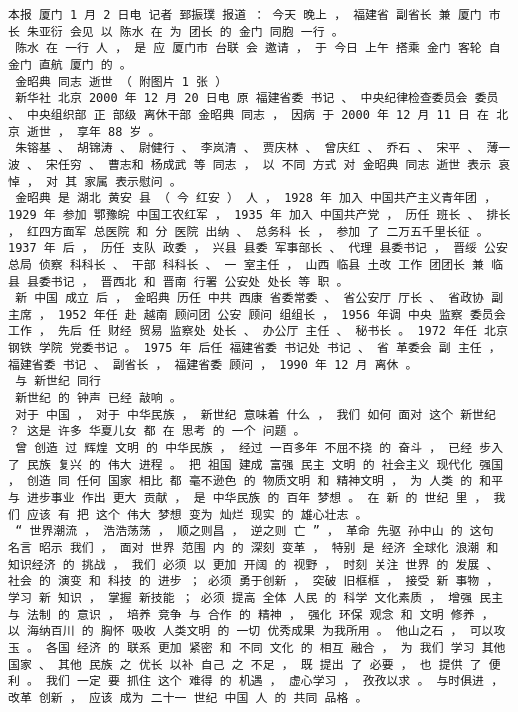 \documentclass{article}
\begin{document}
\begin{Verbatim}[commandchars=\\\{\}]
 本报 厦门 1 月 2 日电 记者 郅振璞 报道 ： 今天 晚上 ， 福建省 副省长 兼 厦门 市长 朱亚衍 会见 以 陈水 在 为 团长 的 金门 同胞 一行 。 
 陈水 在 一行 人 ， 是 应 厦门市 台联 会 邀请 ， 于 今日 上午 搭乘 金门 客轮 自 金门 直航 厦门 的 。 
 金昭典 同志 逝世 （ 附图片 1 张 ） 
 新华社 北京 2000 年 12 月 20 日电 原 福建省委 书记 、 中央纪律检查委员会 委员 、 中央组织部 正 部级 离休干部 金昭典 同志 ， 因病 于 2000 年 12 月 11 日 在 北京 逝世 ， 享年 88 岁 。 
 朱镕基 、 胡锦涛 、 尉健行 、 李岚清 、 贾庆林 、 曾庆红 、 乔石 、 宋平 、 薄一波 、 宋任穷 、 曹志和 杨成武 等 同志 ， 以 不同 方式 对 金昭典 同志 逝世 表示 哀悼 ， 对 其 家属 表示慰问 。 
 金昭典 是 湖北 黄安 县 （ 今 红安 ） 人 ， 1928 年 加入 中国共产主义青年团 ， 1929 年 参加 鄂豫皖 中国工农红军 ， 1935 年 加入 中国共产党 ， 历任 班长 、 排长 ， 红四方面军 总医院 和 分 医院 出纳 、 总务科 长 ， 参加 了 二万五千里长征 。 1937 年 后 ， 历任 支队 政委 ， 兴县 县委 军事部长 、 代理 县委书记 ， 晋绥 公安 总局 侦察 科科长 、 干部 科科长 、 一 室主任 ， 山西 临县 土改 工作 团团长 兼 临县 县委书记 ， 晋西北 和 晋南 行署 公安处 处长 等 职 。 
 新 中国 成立 后 ， 金昭典 历任 中共 西康 省委常委 、 省公安厅 厅长 、 省政协 副 主席 ， 1952 年任 赴 越南 顾问团 公安 顾问 组组长 ， 1956 年调 中央 监察 委员会 工作 ， 先后 任 财经 贸易 监察处 处长 、 办公厅 主任 、 秘书长 。 1972 年任 北京 钢铁 学院 党委书记 。 1975 年 后任 福建省委 书记处 书记 、 省 革委会 副 主任 ， 福建省委 书记 、 副省长 ， 福建省委 顾问 ， 1990 年 12 月 离休 。 
 与 新世纪 同行 
 新世纪 的 钟声 已经 敲响 。 
 对于 中国 ， 对于 中华民族 ， 新世纪 意味着 什么 ， 我们 如何 面对 这个 新世纪 ？ 这是 许多 华夏儿女 都 在 思考 的 一个 问题 。 
 曾 创造 过 辉煌 文明 的 中华民族 ， 经过 一百多年 不屈不挠 的 奋斗 ， 已经 步入 了 民族 复兴 的 伟大 进程 。 把 祖国 建成 富强 民主 文明 的 社会主义 现代化 强国 ， 创造 同 任何 国家 相比 都 毫不逊色 的 物质文明 和 精神文明 ， 为 人类 的 和平 与 进步事业 作出 更大 贡献 ， 是 中华民族 的 百年 梦想 。 在 新 的 世纪 里 ， 我们 应该 有 把 这个 伟大 梦想 变为 灿烂 现实 的 雄心壮志 。 
 “ 世界潮流 ， 浩浩荡荡 ， 顺之则昌 ， 逆之则 亡 ” ， 革命 先驱 孙中山 的 这句 名言 昭示 我们 ， 面对 世界 范围 内 的 深刻 变革 ， 特别 是 经济 全球化 浪潮 和 知识经济 的 挑战 ， 我们 必须 以 更加 开阔 的 视野 ， 时刻 关注 世界 的 发展 、 社会 的 演变 和 科技 的 进步 ； 必须 勇于创新 ， 突破 旧框框 ， 接受 新 事物 ， 学习 新 知识 ， 掌握 新技能 ； 必须 提高 全体 人民 的 科学 文化素质 ， 增强 民主 与 法制 的 意识 ， 培养 竞争 与 合作 的 精神 ， 强化 环保 观念 和 文明 修养 ， 以 海纳百川 的 胸怀 吸收 人类文明 的 一切 优秀成果 为我所用 。 他山之石 ， 可以攻玉 。 各国 经济 的 联系 更加 紧密 和 不同 文化 的 相互 融合 ， 为 我们 学习 其他 国家 、 其他 民族 之 优长 以补 自己 之 不足 ， 既 提出 了 必要 ， 也 提供 了 便利 。 我们 一定 要 抓住 这个 难得 的 机遇 ， 虚心学习 ， 孜孜以求 。 与时俱进 ， 改革 创新 ， 应该 成为 二十一 世纪 中国 人 的 共同 品格 。 

\end{Verbatim}
\end{document}
